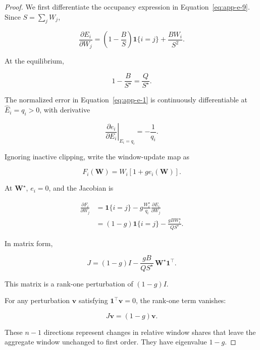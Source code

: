 \begin{proof} We first differentiate the occupancy expression in Equation~\eqref{eq:app-e-9}. Since \(S=\sum_jW_j\),

\begin{equation}
\label{eq:app-e-16}
\frac{\partial E_i}{\partial W_j}
=
\left(1-\frac BS\right)\mathbf 1\{i=j\}
+
\frac{BW_i}{S^2}.
\end{equation}

At the equilibrium,

\begin{equation}
\label{eq:app-e-17}
1-\frac{B}{S^\star}=\frac{Q}{S^\star}.
\end{equation}

The normalized error in Equation~\eqref{eq:app-e-1} is continuously differentiable at \(\widehat E_i=q_i>0\), with derivative

\begin{equation}
\label{eq:app-e-18}
\left.
\frac{\partial e_i}{\partial E_i}
\right|_{E_i=q_i}
=-\frac1{q_i}.
\end{equation}

Ignoring inactive clipping, write the window-update map as

\[
F_i(\mathbf W)=W_i[1+ge_i(\mathbf W)].
\]

At \(\mathbf W^\star\), \(e_i=0\), and the Jacobian is

\begin{equation}
\label{eq:app-e-19}
\begin{aligned}
\frac{\partial F_i}{\partial W_j}
&=\mathbf 1\{i=j\}
-g\frac{W_i^\star}{q_i}
\frac{\partial E_i}{\partial W_j}\\
&=(1-g)\mathbf 1\{i=j\}
-\frac{gB W_i^\star}{QS^\star}.
\end{aligned}
\end{equation}

In matrix form,

\begin{equation}
\label{eq:app-e-20}
\boxed{
J=(1-g)I
-\frac{gB}{QS^\star}\,
\mathbf W^\star\mathbf 1^\top.
}
\end{equation}

This matrix is a rank-one perturbation of \((1-g)I\).

For any perturbation \(\mathbf v\) satisfying \(\mathbf 1^\top\mathbf v=0\), the rank-one term vanishes:

\[
J\mathbf v=(1-g)\mathbf v.
\]

These \(n-1\) directions represent changes in relative window shares that leave the aggregate window unchanged to first order. They have eigenvalue \(1-g\).


\end{proof}
